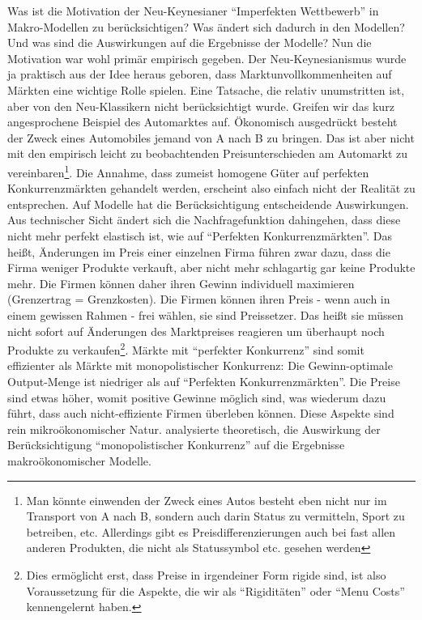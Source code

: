 Was ist die Motivation der Neu-Keynesianer "`Imperfekten Wettbewerb"' in Makro-Modellen zu berücksichtigen? Was ändert sich dadurch in den Modellen? Und was sind die Auswirkungen auf die Ergebnisse der Modelle? Nun die Motivation war wohl primär empirisch gegeben. Der Neu-Keynesianismus wurde ja praktisch aus der Idee heraus geboren, dass Marktunvollkommenheiten auf Märkten eine wichtige Rolle spielen. Eine Tatsache, die relativ unumstritten ist, aber von den Neu-Klassikern nicht berücksichtigt wurde. Greifen wir das kurz angesprochene Beispiel des Automarktes auf. Ökonomisch ausgedrückt besteht der Zweck eines Automobiles jemand von A nach B zu bringen. Das ist aber nicht mit den empirisch leicht zu beobachtenden Preisunterschieden am Automarkt zu vereinbaren\footnote{Man könnte einwenden der Zweck eines Autos besteht eben nicht nur im Transport von A nach B, sondern auch darin Status zu vermitteln, Sport zu betreiben, etc. Allerdings gibt es Preisdifferenzierungen auch bei fast allen anderen Produkten, die nicht als Statussymbol etc. gesehen werden}. Die Annahme, dass zumeist homogene Güter auf perfekten Konkurrenzmärkten gehandelt werden, erscheint also einfach nicht der Realität zu entsprechen.
Auf Modelle hat die Berücksichtigung entscheidende Auswirkungen. Aus technischer Sicht ändert sich die Nachfragefunktion dahingehen, dass diese nicht mehr perfekt elastisch ist, wie auf "`Perfekten Konkurrenzmärkten"'. Das heißt, Änderungen im Preis einer einzelnen Firma führen zwar dazu, dass die Firma weniger Produkte verkauft, aber nicht mehr schlagartig gar keine Produkte mehr. Die Firmen können daher ihren Gewinn individuell maximieren (Grenzertrag = Grenzkosten). Die Firmen können ihren Preis - wenn auch in einem gewissen Rahmen - frei wählen, sie sind Preissetzer. Das heißt sie müssen nicht sofort auf Änderungen des Marktpreises reagieren um überhaupt noch Produkte zu verkaufen\footnote{Dies ermöglicht erst, dass Preise in irgendeiner Form rigide sind, ist also Voraussetzung für die Aspekte, die wir als "`Rigiditäten"' oder "`Menu Costs"' kennengelernt haben.}. Märkte mit "`perfekter Konkurrenz"' sind somit effizienter als Märkte mit monopolistischer Konkurrenz: Die Gewinn-optimale Output-Menge ist niedriger als auf "`Perfekten Konkurrenzmärkten"'. Die Preise sind etwas höher, womit positive Gewinne möglich sind, was wiederum dazu führt, dass auch nicht-effiziente Firmen überleben können. Diese Aspekte sind rein mikroökonomischer Natur. \textcite{Hart1982} analysierte theoretisch, die Auswirkung der Berücksichtigung "`monopolistischer Konkurrenz"' auf die Ergebnisse makroökonomischer Modelle.

